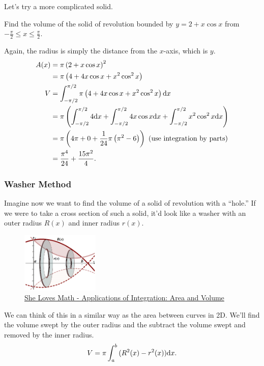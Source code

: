 Let's try a more complicated solid.
\begin{example}
	Find the volume of the solid of revolution bounded by $y=2+x\cos{x}$ from $-\frac{\pi}{2} \leq x \leq \frac{\pi}{2}$.
\end{example}
\begin{answer}
	Again, the radius is simply the distance from the $x$-axis, which is $y$.
	\begin{align*}
		A(x) &= \pi \left(2+x\cos{x}\right)^2 \\
		&= \pi \left(4 + 4x\cos{x} + x^2\cos^2{x}\right) \\
		V &= \int_{-\pi/2}^{\pi/2}{\pi \left(4 + 4x\cos{x} + x^2\cos^2{x}\right)\mathrm{d} x} \\
		&= \pi\left(\int_{-\pi/2}^{\pi/2}{4\mathrm{d} x}+\int_{-\pi/2}^{\pi/2}{4x\cos{x}\mathrm{d} x}+\int_{-\pi/2}^{\pi/2}{x^2\cos^2{x}\mathrm{d} x}\right) \\
		&= \pi\left(4\pi + 0 + \frac{1}{24}\pi\left(\pi^2-6\right)\right) \text{ (use integration by parts)}\\
		&= \frac{\pi^4}{24} + \frac{15\pi^2}{4}.
	\end{align*}
\end{answer}

\subsubsection{Washer Method}
Imagine now we want to find the volume of a solid of revolution with a ``hole.''
If we were to take a cross section of such a solid, it'd look like a washer with an outer radius $R(x)$ and inner radius $r(x)$.

\begin{figure}[H]
	\label{washers}
	\centering
	\includegraphics[width=0.33\textwidth]{./applications_integrals/Washer-1.png}
	\caption{\hyperref{https://www.shelovesmath.com/calculus/integral-calculus/applications-integration-area-volume/}{}{}{She Loves Math - Applications of Integration: Area and Volume}}
\end{figure}


We can think of this in a similar way as the area between curves in 2D.
We'll find the volume swept by the outer radius and the subtract the volume swept and removed by the inner radius.
\begin{equation*}
	V = \pi\int_{a}^{b}{(R^2(x)-r^2(x))\mathrm{d} x}.
\end{equation*}

